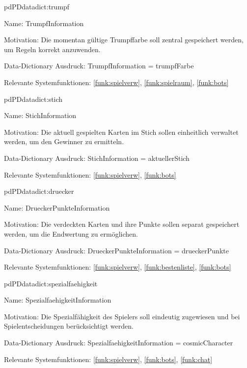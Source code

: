 \begin{description}[leftmargin=5em, style=sameline]
\begin{lhp}{pd}{PD}{datadict:trumpf}
    \item [Name:] TrumpfInformation
    \item [Motivation:] Die momentan gültige Trumpffarbe soll zentral gespeichert werden, um Regeln korrekt anzuwenden.
    \item [Data-Dictionary Ausdruck:] TrumpfInformation = trumpfFarbe
    \item [Relevante Systemfunktionen:] \ref{funk:spielverw}, \ref{funk:spielraum}, \ref{funk:bots}
\end{lhp}

\begin{lhp}{pd}{PD}{datadict:stich}
    \item [Name:] StichInformation
    \item [Motivation:] Die aktuell gespielten Karten im Stich sollen einheitlich verwaltet werden, um den Gewinner zu ermitteln.
    \item [Data-Dictionary Ausdruck:] StichInformation = aktuellerStich
    \item [Relevante Systemfunktionen:] \ref{funk:spielverw}, \ref{funk:bots}
\end{lhp}

\begin{lhp}{pd}{PD}{datadict:druecker}
    \item [Name:] DrueckerPunkteInformation
    \item [Motivation:] Die verdeckten Karten und ihre Punkte sollen separat gespeichert werden, um die Endwertung zu ermöglichen.
    \item [Data-Dictionary Ausdruck:] DrueckerPunkteInformation = drueckerPunkte
    \item [Relevante Systemfunktionen:] \ref{funk:spielverw}, \ref{funk:bestenliste}, \ref{funk:bots}
\end{lhp}

\begin{lhp}{pd}{PD}{datadict:spezialfaehigkeit}
    \item [Name:] SpezialfaehigkeitInformation
    \item [Motivation:] Die Spezialfähigkeit des Spielers soll eindeutig zugewiesen und bei Spielentscheidungen berücksichtigt werden.
    \item [Data-Dictionary Ausdruck:] SpezialfaehigkeitInformation = cosmicCharacter
    \item [Relevante Systemfunktionen:] \ref{funk:spielverw}, \ref{funk:bots}, \ref{funk:chat}
\end{lhp}

\end{description}

